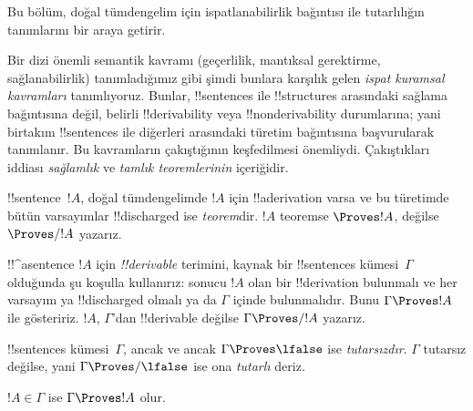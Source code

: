 

      {}
      {}


\begin{editorial}
Bu bölüm, doğal tümdengelim için ispatlanabilirlik bağıntısı ile tutarlılığın
tanımlarını bir araya getirir.
\end{editorial}

\begin{explain}
Bir dizi önemli semantik kavramı (geçerlilik, mantıksal gerektirme,
sağlanabilirlik) tanımladığımız gibi şimdi bunlara karşılık gelen
\emph{ispat kuramsal kavramları} tanımlıyoruz. Bunlar, !!{sentence}s ile
!!{structure}s arasındaki sağlama bağıntısına değil, belirli
!!{derivability} veya !!{nonderivability} durumlarına; yani birtakım
!!{sentence}s ile diğerleri arasındaki türetim bağıntısına başvurularak
tanımlanır. Bu kavramların çakıştığının keşfedilmesi
önemliydi. Çakıştıkları iddiası \emph{sağlamlık} ve \emph{tamlık
teoremlerinin} içeriğidir.
\end{explain}


\begin{defn}[Teoremler]
!!{sentence}~$!A$, doğal tümdengelimde $!A$ için !!a{derivation} varsa ve bu
türetimde bütün varsayımlar !!{discharged} ise \emph{teorem}dir.
$!A$ teoremse
$\Proves !A$, değilse $\Proves/ !A$ yazarız.
\end{defn}

\begin{defn}[!!^{derivability}]
!!^a{sentence} $!A$ için \emph{!!{derivable}} terimini, kaynak bir
!!{sentence}s kümesi~$\Gamma$ olduğunda şu koşulla kullanırız: sonucu $!A$
olan bir !!{derivation} bulunmalı ve her varsayım ya !!{discharged} olmalı ya
da $\Gamma$ içinde bulunmalıdır. Bunu $\Gamma \Proves !A$ ile gösteririz.
$!A$, $\Gamma$'dan !!{derivable} değilse $\Gamma \Proves/ !A$ yazarız.
\end{defn}

\begin{defn}[Tutarlılık]
!!{sentence}s kümesi~$\Gamma$, ancak ve ancak $\Gamma \Proves \lfalse$ ise
\emph{tutarsızdır}. $\Gamma$ tutarsız değilse, yani $\Gamma \Proves/
\lfalse$ ise ona \emph{tutarlı} deriz.
\end{defn}

\begin{prop}[Yansıma]
$!A \in \Gamma$ ise $\Gamma \Proves !A$ olur.
\end{prop}


